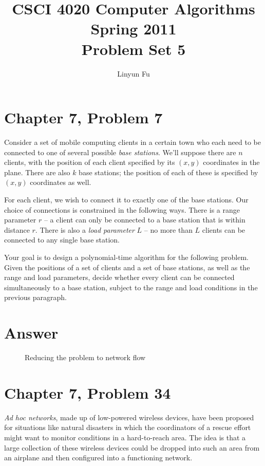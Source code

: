 \documentclass[12pt,letterpaper]{article}
\author{Linyun Fu}
\title{CSCI 4020 Computer Algorithms Spring 2011\\
Problem Set 5}
\begin{document}
\maketitle
\section*{Chapter 7, Problem 7}
Consider a set of mobile computing clients in a certain town who each
need to be connected to one of several possible \emph{base stations}. We'll
suppose there are $n$ clients, with the position of each client specified
by its $(x, y)$ coordinates in the plane. There are also $k$ base stations; the
position of each of these is specified by $(x, y)$ coordinates as well.

For each client, we wish to connect it to exactly one of the base
stations. Our choice of connections is constrained in the following ways.
There is a range parameter $r$ -- a client can only be connected to a base
station that is within distance $r$. There is also a \emph{load parameter} $L$ -- no
more than $L$ clients can be connected to any single base station.

Your goal is to design a polynomial-time algorithm for the following
problem. Given the positions of a set of clients and a set of base stations,
as well as the range and load parameters, decide whether every client can
be connected simultaneously to a base station, subject to the range and
load conditions in the previous paragraph.

\section*{Answer}

\begin{figure}
\caption{Reducing the problem to network flow}
\end{figure}

\section*{Chapter 7, Problem 34}
\emph{Ad hoc networks}, made up of low-powered wireless devices, have been
proposed for situations like natural disasters in which the coordinators
of a rescue effort might want to monitor conditions in a hard-to-reach
area. The idea is that a large collection of these wireless devices could be
dropped into such an area from an airplane and then configured into a
functioning network.
\end{document}
